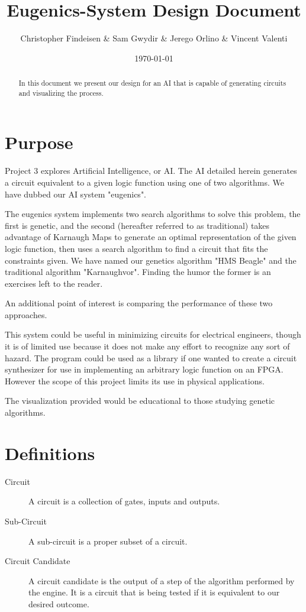 \documentclass{article}
\author{Christopher Findeisen \& Sam Gwydir \& Jerego Orlino \& Vincent Valenti}
\date{\today}
\title{Eugenics-System Design Document}
\begin{document}
\maketitle
\begin{abstract}
In this document we present our design for an AI that is capable of generating
circuits and visualizing the process.
\end{abstract}

\setcounter{tocdepth}{2}
\tableofcontents
\pagebreak

\section{Purpose}
\label{sec-1}

Project 3 explores Artificial Intelligence, or AI. The AI detailed herein
generates a circuit equivalent to a given logic function using one of two
algorithms. We have dubbed our AI system "eugenics".


The eugenics system implements two search algorithms to solve this problem, the
first is genetic, and the second (hereafter referred to as traditional) takes
advantage of Karnaugh Maps to generate an optimal representation of the given
logic function, then uses a search algorithm to find a circuit that fits the
constraints given. We have named our genetics algorithm "HMS Beagle" and the
traditional algorithm "Karnaughvor". Finding the humor the former is an
exercises left to the reader.

An additional point of interest is comparing the performance
of these two approaches.

This system could be useful in minimizing circuits for electrical engineers,
though it is of limited use because it does not make any effort to recognize any
sort of hazard. The program could be used as a library if one wanted to create a
circuit synthesizer for use in implementing an arbitrary logic function on an
FPGA. However the scope of this project limits its use in physical
applications.

The visualization provided would be educational to those studying genetic
algorithms.

\section{Definitions}
\label{sec-2}

\begin{description}
\item[{Circuit}] A circuit is a collection of gates, inputs and outputs.

\item[{Sub-Circuit}] A sub-circuit is a proper subset of a circuit.

\item[{Circuit Candidate}] A circuit candidate is the output of a step of the algorithm performed by the
engine. It is a circuit that is being tested if it is equivalent to our desired
outcome.
\end{description}
\end{document}
